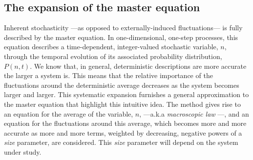 \subsection{The expansion of the master equation}
\label{expansion}
Inherent stochasticity ---as opposed to externally-induced fluctuations--- is fully described by the master equation. In one-dimensional, one-step processes, this equation describes a time-dependent, integer-valued stochastic variable, $n$, through the temporal evolution of its associated probability distribution, $P(n,t)$. We know that, in general, deterministic descriptions are more accurate the larger a system is. This means that the relative importance of the fluctuations around the deterministic average decreases as the system becomes larger and larger. This systematic expansion furnishes a general approximation to the master equation that highlight this intuitive idea. The method gives rise to an equation for the average of the variable, $n$, ---a.k.a {\em macroscopic law} \cite{vanKampen92}---, and an equation for the fluctuations around this average, which becomes more and more accurate as more and more terms, weighted by decreasing, negative powers of a {\em size} parameter, are considered. This {\em size} parameter will depend on the system under study.  
\smallskip

